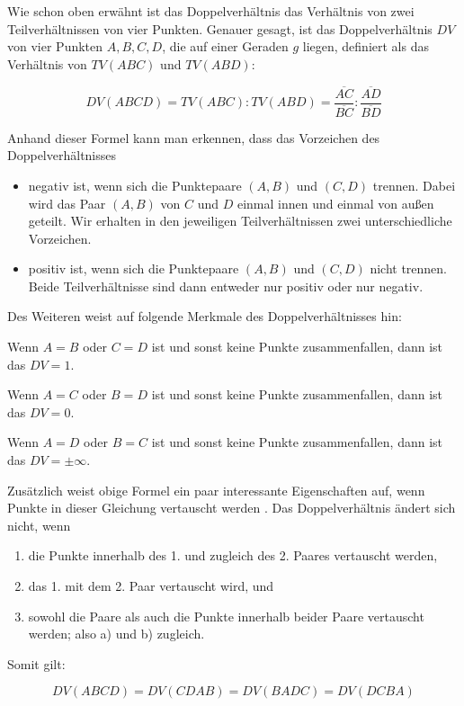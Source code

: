 \documentclass[12pt,a4paper]{article}
\begin{document}
Wie schon oben erwähnt ist das Doppelverhältnis das Verhältnis von zwei Teilverhältnissen von vier Punkten. Genauer gesagt, ist das Doppelverhältnis $DV$ von vier Punkten $A, B, C, D$, die auf einer Geraden $g$ liegen, definiert als das Verhältnis von $TV(A B C)$ und $TV(A B D)$:

\[DV(A B C D) = TV(A B C) : TV(A B D) = \dfrac{\overline{A C}}{\overline{B C}} : \dfrac{\overline{A D}}{\overline{B D}}\]

Anhand dieser Formel kann man erkennen, dass das Vorzeichen des Doppelverhältnisses
\begin{itemize}
\item negativ ist, wenn sich die Punktepaare $(A, B)$ und $(C, D)$ trennen. Dabei wird das Paar $(A, B)$ von $C$ und $D$ einmal innen und einmal von außen geteilt. Wir erhalten in den jeweiligen Teilverhältnissen zwei unterschiedliche Vorzeichen.
\item positiv ist, wenn sich die Punktepaare $(A, B)$ und $(C, D)$ nicht trennen. Beide Teilverhältnisse sind dann entweder nur positiv oder nur negativ.
\end{itemize}

Des Weiteren weist \citep{projektiveGeometrie} auf folgende Merkmale des Doppelverhältnisses hin:

Wenn $A = B$ oder $C = D$ ist und sonst keine Punkte zusammenfallen, dann ist das $DV = 1$.

Wenn $A = C$ oder $B = D$ ist und sonst keine Punkte zusammenfallen, dann ist das $DV = 0$.

Wenn $A = D$ oder $B = C$ ist und sonst keine Punkte zusammenfallen, dann ist das $DV = \pm\infty$.

Zusätzlich weist obige Formel ein paar interessante Eigenschaften auf, wenn Punkte in dieser Gleichung vertauscht werden \citep[vgl.][S.~77]{projektiveGeometrie}. Das Doppelverhältnis ändert sich nicht, wenn

\begin{enumerate}[label={\alph*)}] 
\item die Punkte innerhalb des 1. und zugleich des 2. Paares vertauscht werden,
\item das 1. mit dem 2. Paar vertauscht wird, und
\item sowohl die Paare als auch die Punkte innerhalb beider Paare vertauscht werden; also a) und b) zugleich.
\end{enumerate}

Somit gilt:

\[DV(A B C D) = DV(C D A B) = DV(B A D C) = DV(D C B A)\]
\end{document}
